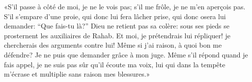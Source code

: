 «S’il passe à côté de moi, je ne le vois pas; s’il me frôle, je ne m’en aperçois pas.
S’il s’empare d’une proie, qui donc lui fera lâcher prise,
	qui donc osera lui demander: “Que fais-tu là?”
Dieu ne retient pas sa colère: sous ses pieds se prosternent les auxiliaires de Rahab.
Et moi, je prétendrais lui répliquer!
	je chercherais des arguments contre lui!
Même si j’ai raison, à quoi bon me défendre?
Je ne puis que demander grâce à mon juge.
Même s’il répond quand je fais appel, je ne suis pas sûr qu’il écoute ma voix,
	lui qui dans la tempête m’écrase et multiplie sans raison mes blessures.»
